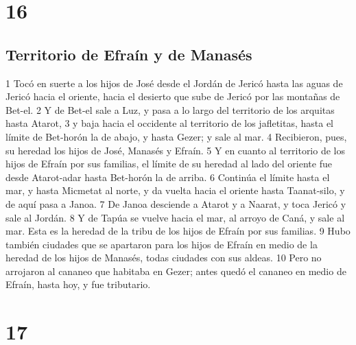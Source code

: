 \chapter{16}

\section*{Territorio de Efraín y de Manasés}

1 Tocó en suerte a los hijos de José desde el Jordán de Jericó hasta las aguas de Jericó hacia el oriente, hacia el desierto que sube de Jericó por las montañas de Bet-el.
2 Y de Bet-el sale a Luz, y pasa a lo largo del territorio de los arquitas hasta Atarot,
3 y baja hacia el occidente al territorio de los jafletitas, hasta el límite de Bet-horón la de abajo, y hasta Gezer; y sale al mar.
4 Recibieron, pues, su heredad los hijos de José, Manasés y Efraín.
5 Y en cuanto al territorio de los hijos de Efraín por sus familias, el límite de su heredad al lado del oriente fue desde Atarot-adar hasta Bet-horón la de arriba.
6 Continúa el límite hasta el mar, y hasta Micmetat al norte, y da vuelta hacia el oriente hasta Taanat-silo, y de aquí pasa a Janoa.
7 De Janoa desciende a Atarot y a Naarat, y toca Jericó y sale al Jordán.
8 Y de Tapúa se vuelve hacia el mar, al arroyo de Caná, y sale al mar. Esta es la heredad de la tribu de los hijos de Efraín por sus familias.
9 Hubo también ciudades que se apartaron para los hijos de Efraín en medio de la heredad de los hijos de Manasés, todas ciudades con sus aldeas.
10 Pero no arrojaron al cananeo que habitaba en Gezer; antes quedó el cananeo en medio de Efraín, hasta hoy, y fue tributario.

\chapter{17}

